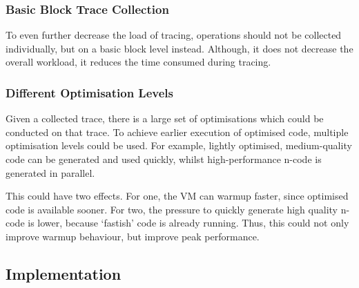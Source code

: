 \subsubsection{Basic Block Trace Collection} To even further decrease the load of
tracing, operations should not be collected individually, but on a basic block
level instead. Although, it does not decrease the overall workload, it reduces
the time consumed during tracing.

\subsubsection{Different Optimisation Levels}

Given a collected trace, there is a large set of optimisations which could be
conducted on that trace. To achieve earlier execution of
optimised code, multiple optimisation levels could be used. For example,
lightly optimised, medium-quality code can be generated and used quickly, whilst
high-performance n-code is generated in parallel.

This could have two effects. For one, the VM can warmup faster, since optimised
code is available sooner. For two, the pressure to quickly generate high quality
n-code is lower, because `fastish' code is already running. Thus, this could not
only improve warmup behaviour, but improve peak performance.

\subsection{Implementation}

